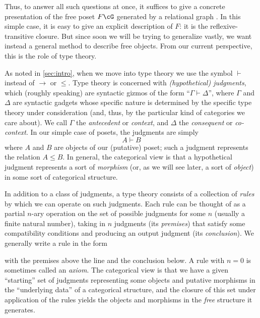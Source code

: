 \documentclass{book}
\let\types\vdash
\begin{document}
Thus, to answer all such questions at once, it suffices to give a concrete presentation of the free poset $F\cG$ generated by a relational graph \cG.
In this simple case, it is easy to give an explicit description of $F$: it is the reflexive-transitive closure.
But since soon we will be trying to generalize vastly, we want instead a general method to describe free objects.
From our current perspective, this is the role of type theory.

As noted in \cref{sec:intro}, when we move into type theory we use the symbol $\types$ instead of $\to$ or $\le$.
Type theory is concerned with \emph{(hypothetical) judgments}, which (roughly speaking) are syntactic gizmos of the form ``$\Gamma\types\Delta$'', where $\Gamma$ and $\Delta$ are syntactic gadgets whose specific nature is determined by the specific type theory under consideration (and, thus, by the particular kind of categories we care about).
We call $\Gamma$ the \emph{antecedent} or \emph{context}, and $\Delta$ the \emph{consequent} or \emph{co-context}.
In our simple case of posets, the judgments are simply
\[ A \types B \]
where $A$ and $B$ are objects of our (putative) poset; such a judgment represents the relation $A\le B$.
In general, the categorical view is that a hypothetical judgment represents a sort of \emph{morphism} (or, as we will see later, a sort of \emph{object}) in some sort of categorical structure.

In addition to a class of judgments, a type theory consists of a collection of \emph{rules} by which we can operate on such judgments.
Each rule can be thought of as a partial $n$-ary operation on the set of possible judgments for some $n$ (usually a finite natural number), taking in $n$ judgments (its \emph{premises}) that satisfy some compatibility conditions and producing an output judgment (its \emph{conclusion}).
We generally write a rule in the form
\begin{mathpar}
\end{mathpar}
with the premises above the line and the conclusion below.
A rule with $n=0$ is sometimes called an \emph{axiom}.
The categorical view is that we have a given ``starting'' set of judgments representing some objects and putative morphisms in the ``underlying data'' of a categorical structure, and the closure of this set under application of the rules yields the objects and morphisms in the \emph{free} structure it generates.
\end{document}

